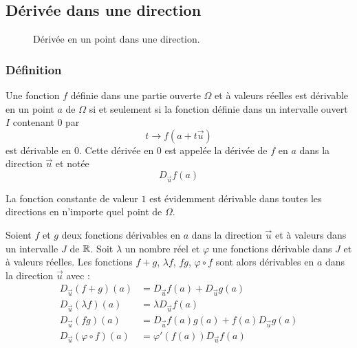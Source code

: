 \subsection{Dérivée dans une direction}
\begin{figure}[ht]
 \centering
 
 \caption{Dérivée en un point dans une direction.}
 \label{fig:C2268_1}
\end{figure}
\subsubsection{Définition}
\begin{defi}
 Une fonction $f$ définie dans une partie ouverte $\Omega$ et à valeurs réelles est dérivable en un point $a$ de $\Omega$ si et seulement si la fonction définie dans un intervalle ouvert $I$ contenant $0$ par 
\begin{displaymath}
 t \rightarrow f(a + t \overrightarrow u)
\end{displaymath}
est dérivable en $0$. Cette dérivée en $0$ est appelée la dérivée de $f$ en $a$ dans la direction $\overrightarrow u$ et notée 
\begin{displaymath}
 D_{\overrightarrow u}f(a)
\end{displaymath}
\end{defi}
\begin{rem}
 La fonction constante de valeur $1$ est évidemment dérivable dans toutes les directions en n'importe quel point de $\Omega$.
\end{rem}

\begin{prop}
 Soient $f$ et $g$ deux fonctions dérivables en $a$ dans la direction $\overrightarrow u$ et à valeurs dans un intervalle $J$ de $\mathbb{R}$. Soit $\lambda$ un nombre réel et $\varphi$ une fonctions dérivable dans $J$ et  à valeurs réelles. Les fonctions $f+g$, $\lambda f$, $fg$, $\varphi \circ f$ sont alors dérivables en $a$ dans la direction $\overrightarrow u$ avec :
\begin{align*}
 D_{\overrightarrow u}(f+g)(a) &= D_{\overrightarrow u}f(a) + D_{\overrightarrow u}g(a) \\
 D_{\overrightarrow u}(\lambda f)(a) &= \lambda D_{\overrightarrow u}f(a) \\
 D_{\overrightarrow u}(fg)(a) &= D_{\overrightarrow u}f(a) g(a)+ f(a)D_{\overrightarrow u}g(a) \\
 D_{\overrightarrow u}(\varphi \circ f)(a) &= \varphi'(f(a)) D_{\overrightarrow u}f(a)
\end{align*}
\end{prop}
